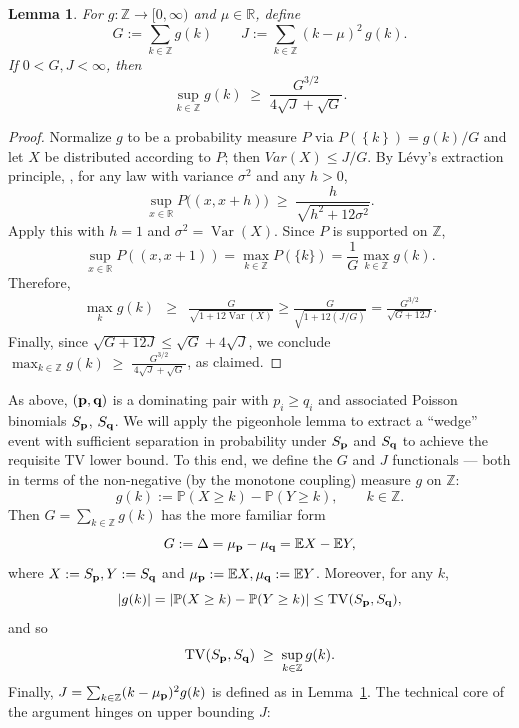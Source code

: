 \documentclass[11pt]{amsart}
\theoremstyle{plain}
\newtheorem{lemma}[theorem]{Lemma}
\theoremstyle{definition}
\DeclareMathOperator{\TV}{TV}
\DeclareMathOperator{\Var}{Var}
\newcommand{\R}{\mathbb{R}}
\newcommand{\Z}{\mathbb{Z}}
\newcommand{\E}{\mathbb{E}}
\renewcommand{\P}{\mathbb{P}}
\newcommand{\beq}{\begin{eqnarray*}}
\newcommand{\eeq}{\end{eqnarray*}}
\newcommand{\set}[1]{\left\{ #1 \right\}}
\newcommand{\mypoi}[1]{S_{#1}}
\renewcommand{\vec}[1]{\textup{{\bf #1}}}
\begin{document}
\begin{lemma}
\label{lem:pigeonhole}
For $g:\mathbb{Z}\to[0,\infty)$
and $\mu\in\R$,
define
\[
  G := \sum_{k\in\mathbb{Z}} g(k)
  \qquad
  J :=
  \sum_{k\in\mathbb{Z}} (k-\mu)^2\, g(k).
\]
If $0<G,J<\infty$, then
\[
  \sup_{k\in\mathbb{Z}} g(k)
  \;\ge\;
  \frac{G^{3/2}}{4\sqrt{J}+\sqrt{G}}.
\]
\end{lemma}
\begin{proof}
Normalize $g$ to be a probability measure $P$ via $P(\set{k})=g(k)/G$
and let $X$ be distributed according to $P$;
then
$Var(X)\le J/G$.
By 
Lévy's extraction principle,
\cite[Disp.~(18)]{MattnerSchulz2018NormalApproximations}, for any law
with variance $\sigma^2$ and any $h>0$,
\[
\sup_{x\in\mathbb{R}} P\bigl((x,x+h)\bigr)
\;\ge\;
\frac{h}{\sqrt{h^2+12\sigma^2}}.
\]
Apply this with $h=1$ and $\sigma^2=\Var(X)$. Since $P$ is supported on $\mathbb{Z}$,
\[
\sup_{x\in\mathbb{R}} P((x,x+1))
= \max_{k\in\mathbb{Z}} P(\{k\})
= \frac{1}{G}\max_{k\in\mathbb{Z}} g(k).
\]
Therefore,
\beq
\max_k g(k)
&\ge&
\frac{G}{\sqrt{1+12\Var(X)}}
\ge
\frac{G}{\sqrt{1+12(J/G)}}
=
\frac{G^{3/2}}{\sqrt{G+12J}}
.
\eeq
Finally, since $\sqrt{G+12J}\le \sqrt{G}+4\sqrt{J}$, we conclude
$
\max_{k\in\mathbb{Z}} g(k)
\;\ge\;
\frac{G^{3/2}}{\,4\sqrt{J}+\sqrt{G}\,}
$,
as claimed.
\end{proof}




As above, $(\vec{p},\vec{q})$ is a dominating pair with $p_i\ge q_i$ and associated
Poisson binomials
$S_{\vec{p}}$, $S_{\vec{q}}$.
We will apply the pigeonhole lemma to extract a ``wedge'' event
with sufficient separation in probability under
$S_{\vec{p}}$
and $S_{\vec{q}}$ to achieve the requisite TV lower bound.
To this end, we define the $G$ and $J$ functionals --- both
in terms of the non-negative (by the monotone coupling) measure $g$ on $\Z$:
\begin{equation}\label{eq:gdef}
  g(k) := \P(X\ge k)-\P(Y\ge k),
  \qquad k\in\mathbb{Z}.
\end{equation}
Then
$
G
  = \sum_{k\in\mathbb{Z}} g(k)
$
has the more familiar form
\[
  G:=\Delta = \mu_{\vec{p}}-\mu_{\vec{q}} = \E X-\E Y
  ,
\]
where
$  X := S_{\vec{p}},  Y := S_{\vec{q}}$
and
$  \mu_{\vec{p}} := \E X,
  \mu_{\vec{q}} := \E Y
  $.
Moreover, for any $k$,
\[
  |g(k)| = |\P(X\ge k)-\P(Y\ge k)|
  \le \TV(\mypoi{\vec{p}},\mypoi{\vec{q}}),
\]
and so
\begin{equation}\label{eq:TV-ge-supg}
  \TV(\mypoi{\vec{p}},\mypoi{\vec{q}})
  \;\ge\; \sup_{k\in\mathbb{Z}} g(k).
\end{equation}
Finally,
$  J = \sum_{k\in\mathbb{Z}} (k-\mu_{\vec{p}})^2 g(k)
$ is defined as in Lemma~\ref{lem:pigeonhole}.
The technical core of the argument hinges on upper bounding $J$:
\end{document}
